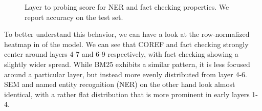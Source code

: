\begin{figure}[!ht]
    \centering
    \begin{subfigure}{\textwidth}
        \centering
    \end{subfigure}

    \begin{subfigure}{\textwidth}
        \centering
    \end{subfigure}
    \caption{Layer to probing score for NER and fact checking properties. We report accuracy on the test set.}
    \label{fig:ner_fac}
\end{figure}

To better understand this behavior, we can have a look at the row-normalized heatmap in  of the  model. We can see that COREF and fact checking strongly center around layers 4-7 and 6-9 respectively, with fact checking showing a slightly wider spread. While BM25 exhibits a similar pattern, it is less focused around a particular layer, but instead more evenly distributed from layer 4-6. SEM and named entity recognition (NER) on the other hand look almost identical, with a rather flat distribution that is more prominent in early layers 1-4.

